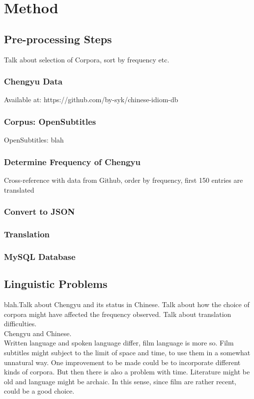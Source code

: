 \documentclass[11pt]{article} %
\begin{document}
\section{Method}
\subsection{Pre-processing Steps}
\indent Talk about selection of Corpora, sort by frequency etc.\\
\subsubsection{Chengyu Data}
Available at: https://github.com/by-syk/chinese-idiom-db\\
\subsubsection{Corpus: OpenSubtitles}
\indent OpenSubtitles: blah\\
\subsubsection{Determine Frequency of Chengyu}
\indent Cross-reference with data from Github, order by frequency, first 150 entries are translated
\subsubsection{Convert to JSON}
\subsubsection{Translation}
\subsubsection{MySQL Database}

\subsection{Linguistic Problems}

\indent blah.Talk about Chengyu and its status in Chinese. Talk about how the choice of corpora might have affected the frequency observed. Talk about translation difficulties.\\
Chengyu and Chinese.\\
Written language and spoken language differ, film language is more so. Film subtitles might subject to the limit of space and time, to use them in a somewhat unnatural way. One improvement to be made could be to incorporate different kinds of corpora. But then there is also a problem with time. Literature might be old and language might be archaic. In this sense, since film are rather recent, could be a good choice.\\
\end{document}
